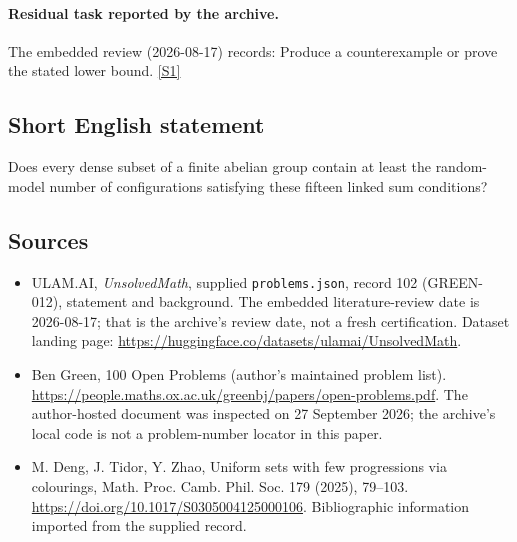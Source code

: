 \documentclass[11pt,a4paper]{article}
\newcommand{\sref}[2]{\hyperlink{source:#1:#2}{[S#2]}}
\begin{document}
\paragraph{Residual task reported by the archive.}

The embedded review (2026-08-17) records: Produce a counterexample or prove the stated lower bound. \sref{102}{1}

\subsection{Short English statement}

Does every dense subset of a finite abelian group contain at least the random-model number of configurations satisfying these fifteen linked sum conditions?

\subsection{Sources}

{\small

\begin{itemize}

\item[\hypertarget{source:102:1}{S1}] ULAM.AI, \emph{UnsolvedMath}, supplied \texttt{problems.json}, record 102 (GREEN-012), statement and background. The embedded literature-review date is 2026-08-17; that is the archive’s review date, not a fresh certification. Dataset landing page: \url{https://huggingface.co/datasets/ulamai/UnsolvedMath}.

\item[\hypertarget{source:102:2}{S2}] Ben Green, 100 Open Problems (author’s maintained problem list). \url{https://people.maths.ox.ac.uk/greenbj/papers/open-problems.pdf}. The author-hosted document was inspected on 27 September 2026; the archive’s local code is not a problem-number locator in this paper.

\item[\hypertarget{source:102:3}{S3}] M. Deng, J. Tidor, Y. Zhao, Uniform sets with few progressions via colourings, Math. Proc. Camb. Phil. Soc. 179 (2025), 79--103. \url{https://doi.org/10.1017/S0305004125000106}. Bibliographic information imported from the supplied record.

\end{itemize}

}

\label{end:102}
\end{document}
